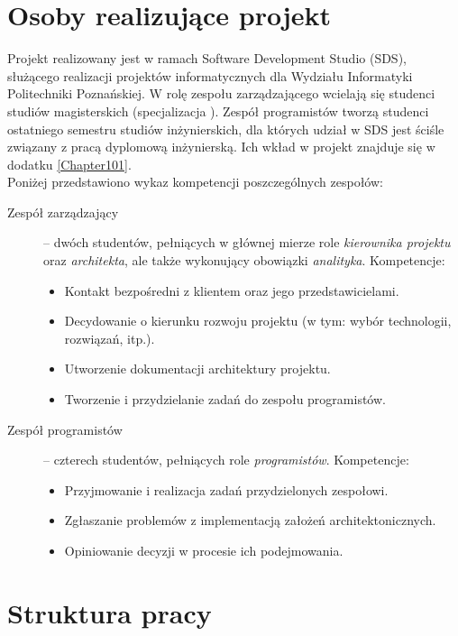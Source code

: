 \section{Osoby realizujące projekt}
\label{Chapter14}

Projekt realizowany jest w ramach Software Development Studio (SDS), służącego realizacji projektów informatycznych dla Wydziału Informatyki Politechniki Poznańskiej. W rolę zespołu zarządzającego wcielają się studenci studiów magisterskich (specjalizacja ). Zespół programistów tworzą studenci ostatniego semestru studiów inżynierskich, dla których udział w SDS jest ściśle związany z pracą dyplomową inżynierską. Ich wkład w projekt znajduje się w dodatku \ref{Chapter101}. \\

Poniżej przedstawiono wykaz kompetencji poszczególnych zespołów:
\begin{description}
\item[Zespół zarządzający] -- dwóch studentów, pełniących w głównej mierze role \emph{kierownika projektu} oraz \emph{architekta}, ale także wykonujący obowiązki \emph{analityka}. Kompetencje:
\begin{itemize}
\item Kontakt bezpośredni z klientem oraz jego przedstawicielami.
\item Decydowanie o kierunku rozwoju projektu (w tym: wybór technologii, rozwiązań, itp.).
\item Utworzenie dokumentacji architektury projektu.
\item Tworzenie i przydzielanie zadań do zespołu programistów.
\end{itemize}
\item[Zespół programistów] -- czterech studentów, pełniących role \emph{programistów}. Kompetencje:
\begin{itemize}
\item Przyjmowanie i realizacja zadań przydzielonych zespołowi.
\item Zgłaszanie problemów z implementacją założeń architektonicznych.
\item Opiniowanie decyzji w procesie ich podejmowania.
\end{itemize}
\end{description}

\section{Struktura pracy}
\label{Chapter15}

